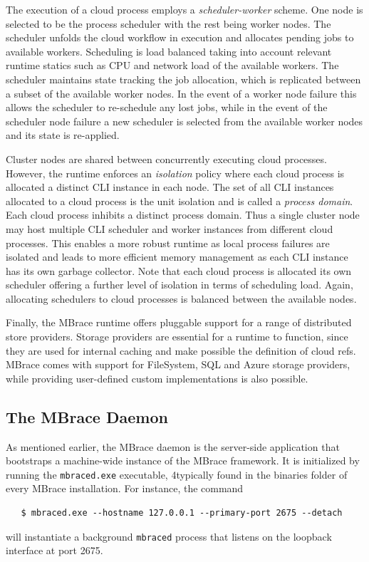\documentclass[9pt,a4paper]{article}
\newcommand{\mbrace}{MBrace}
\newcommand{\TitularMbrace}{MBrace}
\begin{document}
The execution of a cloud process employs a \emph{scheduler-worker} scheme. One
node is selected to be the process scheduler with the rest being worker
nodes. The scheduler unfolds the cloud workflow in execution and allocates
pending jobs to available workers. Scheduling is load balanced taking into
account relevant runtime statics such as CPU and network load of the available
workers. The scheduler maintains state tracking the job allocation, which is
replicated between a subset of the available worker nodes. In the event of a
worker node failure this allows the scheduler to re-schedule any lost jobs,
while in the event of the scheduler node failure a new scheduler is selected
from the available worker nodes and its state is re-applied.

Cluster nodes are shared between concurrently executing cloud
processes. However, the runtime enforces an \emph{isolation} policy where each
cloud process is allocated a distinct CLI instance in each node. The set of all
CLI instances allocated to a cloud process is the unit isolation and is called a
\emph{process domain}. Each cloud process inhibits a distinct process
domain. Thus a single cluster node may host multiple CLI scheduler and worker
instances from different cloud processes. This enables a more robust runtime as
local process failures are isolated and leads to more efficient memory
management as each CLI instance has its own garbage collector. Note that each
cloud process is allocated its own scheduler offering a further level of
isolation in terms of scheduling load. Again, allocating schedulers to cloud
processes is balanced between the available nodes.

Finally, the \mbrace{} runtime offers pluggable support for a range of
distributed store providers. Storage providers are essential for a runtime to
function, since they are used for internal caching and make possible the
definition of cloud refs. \mbrace{} comes with support for FileSystem, SQL and
Azure storage providers, while providing user-defined custom implementations is
also possible.

\subsection{The \TitularMbrace{} Daemon}

As mentioned earlier, the \mbrace{} daemon is the server-side application that
bootstraps a machine-wide instance of the \mbrace{} framework. It is initialized by
running the \texttt{mbraced.exe} executable, 4typically found in the binaries
folder of every \mbrace{} installation. For instance, the command
\begin{verbatim}
   $ mbraced.exe --hostname 127.0.0.1 --primary-port 2675 --detach
\end{verbatim}
will instantiate a background \texttt{mbraced} process that listens on
the loopback interface at port 2675.
\end{document}
